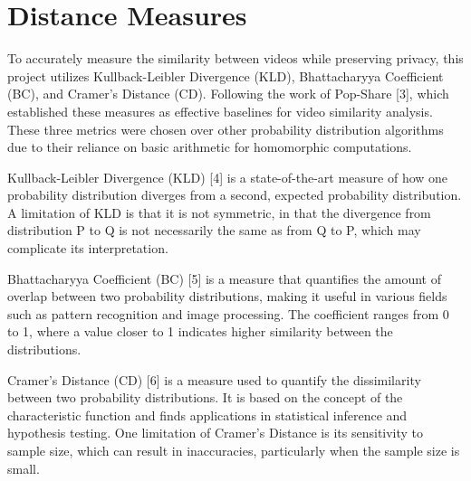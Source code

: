 \section{Distance Measures}

To accurately measure the similarity between videos while preserving privacy, this project utilizes Kullback-Leibler Divergence (KLD), Bhattacharyya Coefficient (BC), and Cramer’s Distance (CD). Following the work of Pop-Share [3], which established these measures as effective baselines for video similarity analysis. These three metrics were chosen over other probability distribution algorithms due to their reliance on basic arithmetic for homomorphic computations.

Kullback-Leibler Divergence (KLD) [4] is a state-of-the-art measure of how one probability distribution diverges from a second, expected probability distribution. A limitation of KLD is that it is not symmetric, in that the divergence from distribution P to Q is not necessarily the same as from Q to P, which may complicate its interpretation.



Bhattacharyya Coefficient (BC) [5] is a measure that quantifies the amount of overlap between two probability distributions, making it useful in various fields such as pattern recognition and image processing. The coefficient ranges from 0 to 1, where a value closer to 1 indicates higher similarity between the distributions.



Cramer’s Distance (CD) [6] is a measure used to quantify the dissimilarity between two probability distributions. It is based on the concept of the characteristic function and finds applications in statistical inference and hypothesis testing. One limitation of Cramer’s Distance is its sensitivity to sample size, which can result in inaccuracies, particularly when the sample size is small.

